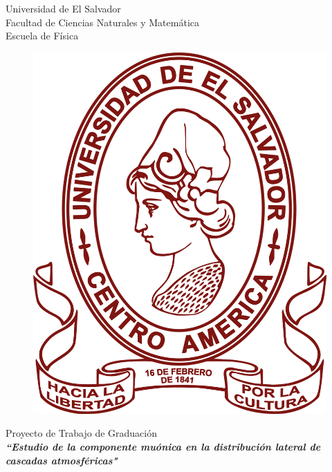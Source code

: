 \begin{titlepage}
	\begin{center}
	\LARGE
	Universidad de El Salvador \\ 
	Facultad de Ciencias Naturales y Matemática  \\
	Escuela de Física
	\end{center}
	
	\vspace{0.5cm}

	\begin{figure}[h]
	\centering
	\includegraphics[scale=0.12]{ues_logo.png}
	\end{figure}

	\vspace{0.5cm}
	
	\begin{center}
	\Large
	Proyecto de Trabajo de Graduaci\'on	\\
	
	\vspace{0.5cm}
	\LARGE
	\textit{\textbf{``Estudio de la componente mu\'onica en la distribuci\'on lateral de cascadas atmosf\'ericas"}}\\
	

\end{center}
\end{titlepage}
